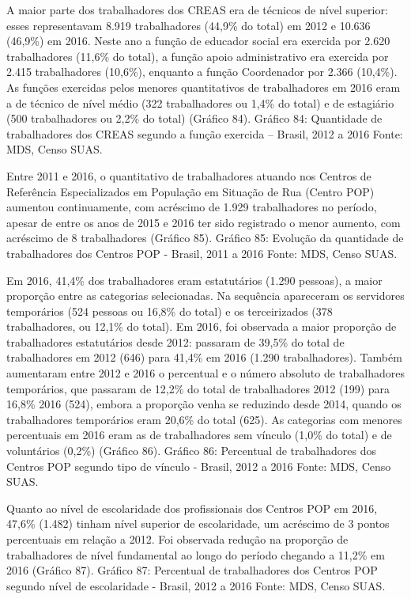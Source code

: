 \documentclass[
  brazilian]{report}
\begin{document}
A maior parte dos trabalhadores dos CREAS era de técnicos de nível
superior: esses representavam 8.919 trabalhadores (44,9\% do total) em
2012 e 10.636 (46,9\%) em 2016. Neste ano a função de educador social
era exercida por 2.620 trabalhadores (11,6\% do total), a função apoio
administrativo era exercida por 2.415 trabalhadores (10,6\%), enquanto a
função Coordenador por 2.366 (10,4\%). As funções exercidas pelos
menores quantitativos de trabalhadores em 2016 eram a de técnico de
nível médio (322 trabalhadores ou 1,4\% do total) e de estagiário (500
trabalhadores ou 2,2\% do total) (Gráfico 84). Gráfico 84: Quantidade de
trabalhadores dos CREAS segundo a função exercida -- Brasil, 2012 a 2016
Fonte: MDS, Censo SUAS.

Entre 2011 e 2016, o quantitativo de trabalhadores atuando nos Centros
de Referência Especializados em População em Situação de Rua (Centro
POP) aumentou continuamente, com acréscimo de 1.929 trabalhadores no
período, apesar de entre os anos de 2015 e 2016 ter sido registrado o
menor aumento, com acréscimo de 8 trabalhadores (Gráfico 85). Gráfico
85: Evolução da quantidade de trabalhadores dos Centros POP - Brasil,
2011 a 2016 Fonte: MDS, Censo SUAS.

Em 2016, 41,4\% dos trabalhadores eram estatutários (1.290 pessoas), a
maior proporção entre as categorias selecionadas. Na sequência
apareceram os servidores temporários (524 pessoas ou 16,8\% do total) e
os terceirizados (378 trabalhadores, ou 12,1\% do total). Em 2016, foi
observada a maior proporção de trabalhadores estatutários desde 2012:
passaram de 39,5\% do total de trabalhadores em 2012 (646) para 41,4\%
em 2016 (1.290 trabalhadores). Também aumentaram entre 2012 e 2016 o
percentual e o número absoluto de trabalhadores temporários, que
passaram de 12,2\% do total de trabalhadores 2012 (199) para 16,8\% 2016
(524), embora a proporção venha se reduzindo desde 2014, quando os
trabalhadores temporários eram 20,6\% do total (625). As categorias com
menores percentuais em 2016 eram as de trabalhadores sem vínculo (1,0\%
do total) e de voluntários (0,2\%) (Gráfico 86). Gráfico 86: Percentual
de trabalhadores dos Centros POP segundo tipo de vínculo - Brasil, 2012
a 2016 Fonte: MDS, Censo SUAS.

Quanto ao nível de escolaridade dos profissionais dos Centros POP em
2016, 47,6\% (1.482) tinham nível superior de escolaridade, um acréscimo
de 3 pontos percentuais em relação a 2012. Foi observada redução na
proporção de trabalhadores de nível fundamental ao longo do período
chegando a 11,2\% em 2016 (Gráfico 87). Gráfico 87: Percentual de
trabalhadores dos Centros POP segundo nível de escolaridade - Brasil,
2012 a 2016 Fonte: MDS, Censo SUAS.
\end{document}
